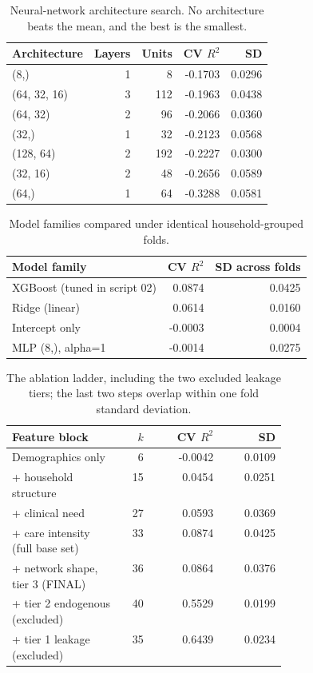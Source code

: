 \documentclass[9pt,twoside]{pnas-new}
\begin{document}
\begin{table}[!ht]
\centering
\caption{Neural-network architecture search. No architecture beats the mean, and the best is the smallest.}
\label{tab:b-arch}
\small
\begin{tabular}{lrrrr}
\toprule
Architecture & Layers & Units & CV $R^2$ & SD \\
\midrule
(8,) & 1 & 8 & -0.1703 & 0.0296 \\
(64, 32, 16) & 3 & 112 & -0.1963 & 0.0438 \\
(64, 32) & 2 & 96 & -0.2066 & 0.0360 \\
(32,) & 1 & 32 & -0.2123 & 0.0568 \\
(128, 64) & 2 & 192 & -0.2227 & 0.0300 \\
(32, 16) & 2 & 48 & -0.2656 & 0.0589 \\
(64,) & 1 & 64 & -0.3288 & 0.0581 \\
\bottomrule
\end{tabular}
\end{table}

\begin{table}[!ht]
\centering
\caption{Model families compared under identical household-grouped folds.}
\label{tab:b-family}
\small
\begin{tabular}{lrr}
\toprule
Model family & CV $R^2$ & SD across folds \\
\midrule
XGBoost (tuned in script 02) & 0.0874 & 0.0425 \\
Ridge (linear) & 0.0614 & 0.0160 \\
Intercept only & -0.0003 & 0.0004 \\
MLP (8,), alpha=1 & -0.0014 & 0.0275 \\
\bottomrule
\end{tabular}
\end{table}

\begin{table}[!ht]
\centering
\caption{The ablation ladder, including the two excluded leakage tiers; the last two steps overlap within one fold standard deviation.}
\label{tab:b-ablation}
\footnotesize
\begin{tabular}{p{0.40\linewidth}rrr}
\toprule
Feature block & $k$ & CV $R^2$ & SD \\
\midrule
Demographics only & 6 & -0.0042 & 0.0109 \\
+ household structure & 15 & 0.0454 & 0.0251 \\
+ clinical need & 27 & 0.0593 & 0.0369 \\
+ care intensity (full base set) & 33 & 0.0874 & 0.0425 \\
+ network shape, tier 3 (FINAL) & 36 & 0.0864 & 0.0376 \\
+ tier 2 endogenous (excluded) & 40 & 0.5529 & 0.0199 \\
+ tier 1 leakage (excluded) & 35 & 0.6439 & 0.0234 \\
\bottomrule
\end{tabular}
\end{table}
\end{document}

